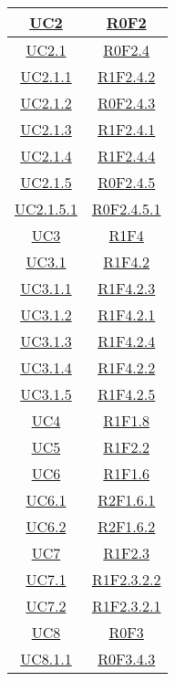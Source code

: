 \begin{longtable}{|c|c|}
\hline
\hyperlink{UC2}{UC2} & \hyperlink{R0F2}{R0F2}\\
\hline
\hyperlink{UC2.1}{UC2.1} & \hyperlink{R0F2.4}{R0F2.4}\\
\hline
\hyperlink{UC2.1.1}{UC2.1.1} & \hyperlink{R1F2.4.2}{R1F2.4.2}\\
\hline
\hyperlink{UC2.1.2}{UC2.1.2} & \hyperlink{R0F2.4.3}{R0F2.4.3}\\
\hline
\hyperlink{UC2.1.3}{UC2.1.3} & \hyperlink{R1F2.4.1}{R1F2.4.1}\\
\hline
\hyperlink{UC2.1.4}{UC2.1.4} & \hyperlink{R1F2.4.4}{R1F2.4.4}\\
\hline
\hyperlink{UC2.1.5}{UC2.1.5} & \hyperlink{R0F2.4.5}{R0F2.4.5}\\
\hline
\hyperlink{UC2.1.5.1}{UC2.1.5.1} & \hyperlink{R0F2.4.5.1}{R0F2.4.5.1}\\
\hline
\hyperlink{UC3}{UC3} & \hyperlink{R1F4}{R1F4}\\
\hline
\hyperlink{UC3.1}{UC3.1} & \hyperlink{R1F4.2}{R1F4.2}\\
\hline
\hyperlink{UC3.1.1}{UC3.1.1} & \hyperlink{R1F4.2.3}{R1F4.2.3}\\
\hline
\hyperlink{UC3.1.2}{UC3.1.2} & \hyperlink{R1F4.2.1}{R1F4.2.1}\\
\hline
\hyperlink{UC3.1.3}{UC3.1.3} & \hyperlink{R1F4.2.4}{R1F4.2.4}\\
\hline
\hyperlink{UC3.1.4}{UC3.1.4} & \hyperlink{R1F4.2.2}{R1F4.2.2}\\
\hline
\hyperlink{UC3.1.5}{UC3.1.5} & \hyperlink{R1F4.2.5}{R1F4.2.5}\\
\hline
\hyperlink{UC4}{UC4} & \hyperlink{R1F1.8}{R1F1.8}\\
\hline
\hyperlink{UC5}{UC5} & \hyperlink{R1F2.2}{R1F2.2}\\
\hline
\hyperlink{UC6}{UC6} & \hyperlink{R1F1.6}{R1F1.6}\\
\hline
\hyperlink{UC6.1}{UC6.1} & \hyperlink{R2F1.6.1}{R2F1.6.1}\\
\hline
\hyperlink{UC6.2}{UC6.2} & \hyperlink{R2F1.6.2}{R2F1.6.2}\\
\hline
\hyperlink{UC7}{UC7} & \hyperlink{R1F2.3}{R1F2.3}\\
\hline
\hyperlink{UC7.1}{UC7.1} & \hyperlink{R1F2.3.2.2}{R1F2.3.2.2}\\
\hline
\hyperlink{UC7.2}{UC7.2} & \hyperlink{R1F2.3.2.1}{R1F2.3.2.1}\\
\hline
\hyperlink{UC8}{UC8} & \hyperlink{R0F3}{R0F3}\\
\hline
\hyperlink{UC8.1.1}{UC8.1.1} & \hyperlink{R0F3.4.3}{R0F3.4.3}\\

\end{longtable}
